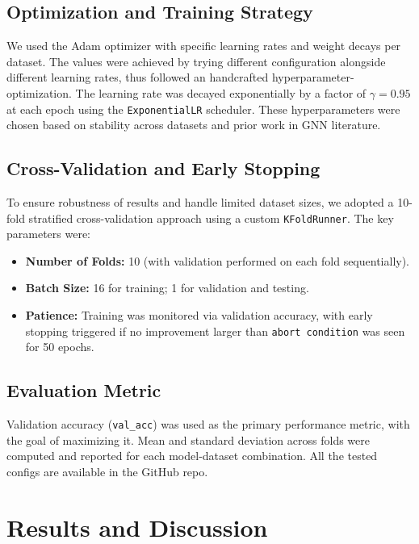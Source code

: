 \documentclass[11pt,a4paper]{article}
\begin{document}
	\subsection{Optimization and Training Strategy}
	
	We used the Adam optimizer with specific learning rates and weight decays per dataset. The values were achieved by trying different configuration alongside different learning rates, thus followed an handcrafted hyperparameter-optimization. The learning rate was decayed exponentially by a factor of $\gamma = 0.95$ at each epoch using the \texttt{ExponentialLR} scheduler. These hyperparameters were chosen based on stability across datasets and prior work in GNN literature.
	
	\subsection{Cross-Validation and Early Stopping}
	
	To ensure robustness of results and handle limited dataset sizes, we adopted a 10-fold stratified cross-validation approach using a custom \texttt{KFoldRunner}. The key parameters were:
	\begin{itemize}
		\item \textbf{Number of Folds:} 10 (with validation performed on each fold sequentially).
		\item \textbf{Batch Size:} 16 for training; 1 for validation and testing.
		\item \textbf{Patience:} Training was monitored via validation accuracy, with early stopping triggered if no improvement larger than \texttt{abort condition} was seen for 50 epochs.
	\end{itemize}
	
	\subsection{Evaluation Metric}
	
	Validation accuracy (\texttt{val\_acc}) was used as the primary performance metric, with the goal of maximizing it. Mean and standard deviation across folds were computed and reported for each model-dataset combination. All the tested configs are available in the GitHub repo.
	
	\section{Results and Discussion}
	
\end{document}
